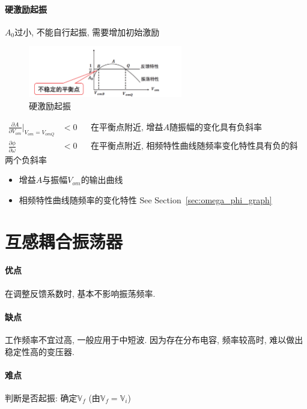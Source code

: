 \documentclass[a4paper]{report}
\begin{document}
\paragraph{硬激励起振} $A_0$过小, 不能自行起振, 需要增加初始激励
\begin{figure}[H]
\centering
\includegraphics[width=0.6\textwidth]{osc_condition_2.png}
\caption{硬激励起振}
\end{figure}

\begin{align*}
  \frac{\partial A }{\partial V_{om}}|_{V_{om}=V_{omQ}}&<0&&\text{在平衡点附近, 增益$A$随振幅的变化具有负斜率}\\
  \frac{\partial \phi }{\partial \omega}&<0 &&\text{在平衡点附近, 相频特性曲线随频率变化特性具有负的斜率}
\end{align*}
两个负斜率
\begin{itemize}
  \item 增益$A$与振幅$V_{om}$的输出曲线
  \item 相频特性曲线随频率的变化特性 See Section~\ref{sec:omega_phi_graph}
\end{itemize}
\section{互感耦合振荡器}
\paragraph{优点} 在调整反馈系数时, 基本不影响振荡频率. 
\paragraph{缺点} 工作频率不宜过高, 一般应用于中短波. 因为存在分布电容, 频率较高时, 难以做出稳定性高的变压器.
\paragraph{难点} 判断是否起振: 确定$\mathbb{V}_f$ (由$\mathbb{V}_f=\mathbb{V}_i$)
\end{document}
